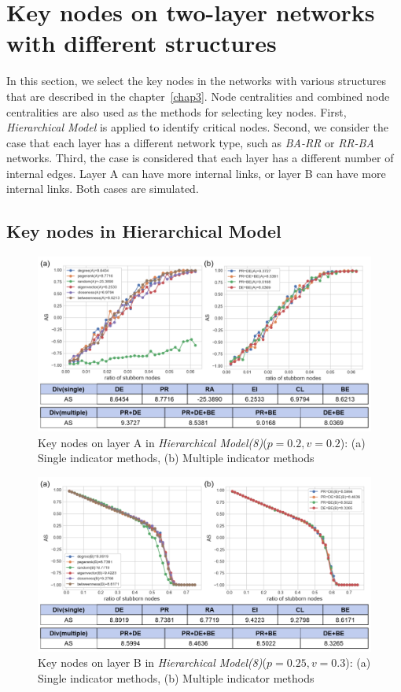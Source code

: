 \section{Key nodes on two-layer networks with different structures}
In this section, we select the key nodes in the networks with various structures that are described in the chapter~\ref{chap3}. Node centralities and combined node centralities are also used as the methods for selecting key nodes. First, \textit{Hierarchical Model} is applied to identify critical nodes. Second, we consider the case that each layer has a different network type, such as \textit{BA-RR} or \textit{RR-BA} networks. Third, the case is considered that each layer has a different number of internal edges. Layer A can have more internal links, or layer B can have more internal links. Both cases are simulated. \\

\subsection{Key nodes in Hierarchical Model}
\begin{figure}[!htb]
	\centering
	\includegraphics[width=\hsize]{figure/chap5_keynode_HM_A.png}
	\caption{Key nodes on layer A in \textit{Hierarchical Model(8)}($p=0.2, v=0.2$):
		(a) Single indicator methods, (b) Multiple indicator methods}
	\label{chap5_keynode_HM_A}
\end{figure}
\begin{figure}[!htb]
	\centering
	\includegraphics[width=\hsize]{figure/chap5_keynode_HM_B.png}
	\caption{Key nodes on layer B in \textit{Hierarchical Model(8)}($p=0.25, v=0.3$):
		(a) Single indicator methods, (b) Multiple indicator methods}
	\label{chap5_keynode_HM_B}
\end{figure}

